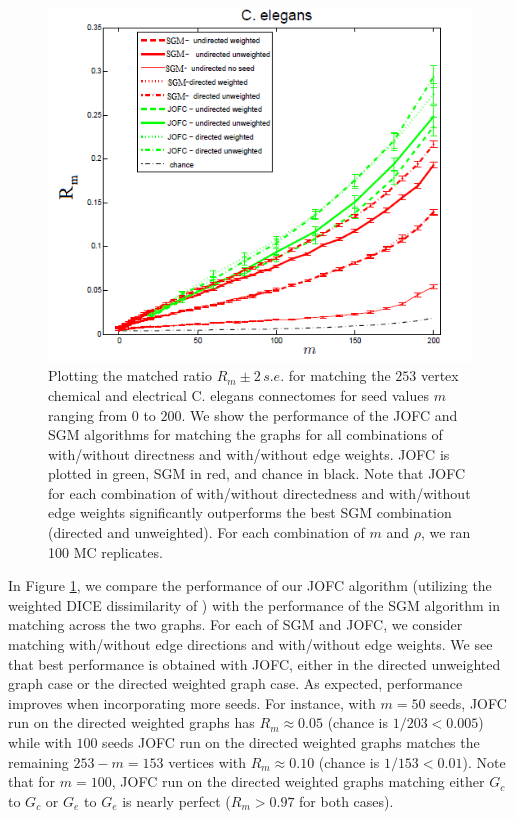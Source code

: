 \documentclass[12pt]{article}
\numberwithin{equation}{section}
\theoremstyle{definition}
\begin{document}
\begin{figure}[h]
\centering
\includegraphics[width=.75\textwidth]{worms.png}
\caption{Plotting the matched ratio $R_m\pm 2\,s.e.$ for matching the
    $253$ vertex chemical and electrical C. elegans connectomes for seed
    values $m$ ranging from $0$ to $200$.%
    We show the performance of the JOFC and SGM algorithms for matching
    the graphs for all combinations of with/without directness and
    with/without edge weights.  JOFC is plotted in green, SGM in red,
    and chance in black.  Note that JOFC for each combination of
    with/without directedness and with/without edge weights
    significantly outperforms the best SGM combination (directed and
    unweighted).  For each combination of $m$ and $\rho$, we ran 100 MC
    replicates.
}
\label{fig:fig4}
\end{figure}
In Figure \ref{fig:fig4}, we compare the performance of our JOFC
algorithm (utilizing the weighted DICE dissimilarity of \cite{dice})
with the performance of the SGM algorithm in matching across the two
graphs.
For each of SGM and JOFC,
we consider matching with/without edge directions and with/without edge weights.  We see that
best performance is obtained with JOFC, either in the directed unweighted graph case or the directed weighted graph case.  As
expected, performance improves when incorporating more seeds.  For instance, with $m = 50$ seeds, JOFC run on the directed weighted graphs has $R_m\approx0.05$ (chance is $1/203<0.005$) while with $100$
seeds JOFC run on the directed weighted graphs matches the remaining $253-m = 153$ vertices with
$R_m\approx 0.10$ (chance is $1/153 < 0.01$).  Note
that for $m = 100$, JOFC run on the directed weighted graphs matching either $G_c$ to $G_c$ or $G_e$
to $G_e$ is nearly perfect ($R_m > 0.97$ for both cases).
\end{document}

